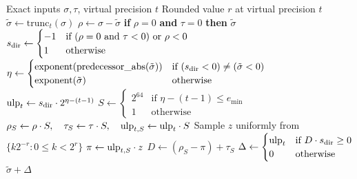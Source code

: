 \begin{algorithm}[t]
\caption{Variable-precision stochastic rounding}
\label{alg:vpsr}
\begin{algorithmic}[1]
\Require Exact inputs $\sigma, \tau$, virtual precision $t$
\Ensure Rounded value $r$ at virtual precision $t$
\State $\tilde{\sigma} \leftarrow \mathrm{trunc}_t(\sigma)$ 
\State $\rho \leftarrow \sigma - \tilde{\sigma}$ 
\State \textbf{if} $\rho = 0$ \textbf{ and } $\tau = 0$ \textbf{then} \Return $\tilde{\sigma}$ 
\State $s_{\rm dir} \leftarrow \begin{cases} -1 & \text{if } (\rho = 0 \text{ and } \tau < 0) \text{ or } \rho < 0 \\ 1 & \text{otherwise} \end{cases}$ 
\Statex {}
\State $\eta \leftarrow \begin{cases} \mathrm{exponent}(\mathrm{predecessor\_abs}(\tilde{\sigma})) & \text{if } (s_{\rm dir} < 0) \neq (\tilde{\sigma} < 0) \\ \mathrm{exponent}(\tilde{\sigma}) & \text{otherwise} \end{cases}$
\State $\mathrm{ulp}_t \leftarrow s_{\rm dir} \cdot 2^{\eta - (t - 1)}$ 
\State $S \leftarrow \begin{cases} 2^{64} & \text{if } \eta - (t - 1) \le e_{\min} \\ 1 & \text{otherwise} \end{cases}$ 
\State $\rho_S \leftarrow \rho \cdot S, \quad \tau_S \leftarrow \tau \cdot S, \quad \mathrm{ulp}_{t,S} \leftarrow \mathrm{ulp}_t \cdot S$
\State Sample $z$ uniformly from $\{k2^{-r}:0\le k<2^r\}$
\State $\pi \leftarrow \mathrm{ulp}_{t,S} \cdot z$ 
\State $D \leftarrow (\rho_S - \pi) + \tau_S$ 
\State $\Delta \leftarrow \begin{cases} \mathrm{ulp}_t & \text{if } D \cdot s_{\rm dir} \ge 0 \\ 0 & \text{otherwise} \end{cases}$
\State \Return $\tilde{\sigma} + \Delta$
\end{algorithmic}
\end{algorithm}

